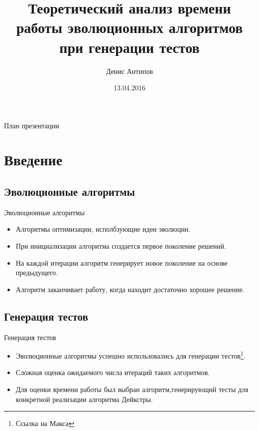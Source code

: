 \documentclass{beamer}
\begin{document}
\title[Автоматическая генерация тестов]{Теоретический анализ времени работы эволюционных алгоритмов при генерации тестов}
\author[Денис Антипов]{Денис Антипов}
\date{13.04.2016}

 
\begin{frame}
 \maketitle
\end{frame}
 
 \begin{frame}{План презентации}
  \tableofcontents
 \end{frame}

 \section{Введение}
 \subsection{Эволюционные алгоритмы}
 \begin{frame}{Эволюционные алгоритмы}
  \begin{itemize}
   \item Алгоритмы оптимизации, исполбзующие идеи эволюции.
   \item При инициализации алгоритма создается первое поколение решений.
   \item На каждой итерации алгоритм генерирует новое поколение на основе предыдущего.
   \item Алгоритм заканчивает работу, когда находит достаточно хорошее решение.
  \end{itemize}
 \end{frame}
 
 \subsection{Генерация тестов}
 \begin{frame}{Генерация тестов}
  \begin{itemize}
   \item Эволюционные алгоритмы успешно использовались для генерации тестов\footnote{Ссылка на Макса}.
   \item Сложная оценка ожидаемого числа итераций таких алгоритмов.
   \item Для оценки времени работы был выбран алгоритм,генерирующий тесты для конкретной реализации алгоритма Дейкстры.
  \end{itemize}
 \end{frame}
 
\end{document}
